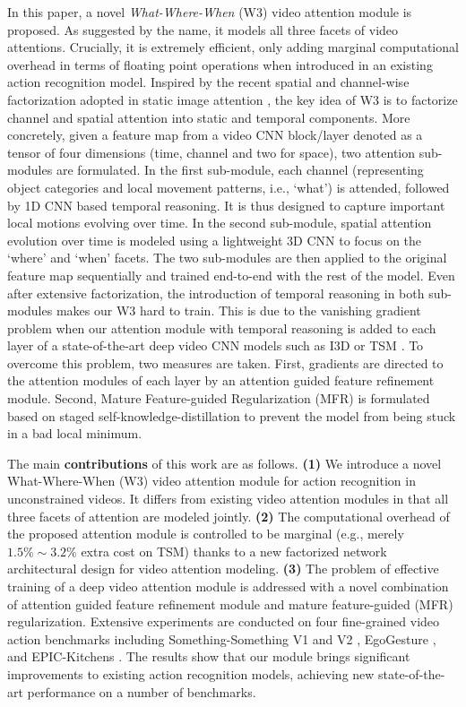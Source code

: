 \documentclass[runningheads]{llncs}
\makeatletter
\newcommand{\fullname}{What-Where-When}\newcommand{\shortname}{W3}\newcommand{\centered}[1]{\begin{tabular}{@{}l@{}} #1 \end{tabular}}
\makeatother
\begin{document}
In this paper, a novel {\em \fullname{}} (\shortname{}) video attention module is proposed. As suggested by the name, it models all three facets of video attentions. Crucially, it is extremely efficient, only adding marginal computational overhead in terms of floating point operations when 
introduced in an existing action recognition model. 
Inspired by the recent spatial and channel-wise factorization adopted in static image attention \cite{woo2018cbam}, 
the key idea of \shortname{} is to factorize channel and spatial attention into static and temporal components.
More concretely, given a feature map from a video CNN block/layer denoted as a tensor of four dimensions (time, channel and two for space), two attention sub-modules are formulated. 
In the first sub-module, each channel (representing object categories and  local movement patterns, i.e., `what') is attended, followed by 1D CNN based temporal reasoning. 
It is thus designed to capture important local motions evolving over time. In the second sub-module, spatial attention evolution over time is modeled using a lightweight 3D CNN to focus on the `where' and `when' facets. 
The two sub-modules are then applied to the original feature map sequentially and trained end-to-end with the rest of the model.  
Even after extensive factorization, the introduction of temporal reasoning in both sub-modules makes our \shortname{} hard to train. 
This is due to the vanishing gradient problem when our attention module with temporal reasoning is added to each layer of a state-of-the-art deep video CNN models such as I3D \cite{carreira2017quo} or TSM \cite{lin2019tsm}. 
To overcome this problem, two measures are taken. 
First,  gradients are  directed to the attention modules of each layer by an attention guided feature refinement module. 
Second, Mature Feature-guided Regularization (MFR) is formulated based on staged self-knowledge-distillation to prevent the model from being stuck in a bad local minimum.  




The main {\bf contributions} of this work are as follows. {\bf (1)}  We introduce a novel \fullname{} (\shortname{}) video attention module
for action recognition in unconstrained videos. It differs from existing video attention modules in that all three facets of attention are modeled jointly. {\bf (2)} The computational overhead of the proposed attention module is controlled to be marginal (e.g., merely $1.5\%\sim3.2\%$ extra cost on TSM) thanks to a new factorized network architectural design for video attention modeling. {\bf (3)} The problem of effective training of a deep video attention module is addressed with a novel combination of attention guided feature refinement module and mature feature-guided (MFR) regularization. 
Extensive experiments are conducted on four fine-grained video action benchmarks including Something-Something V1 \cite{goyal2017something} and V2 \cite{mahdisoltani2018fine},
EgoGesture \cite{zhang2018egogesture}, and EPIC-Kitchens \cite{damen2018scaling}. The results show that our module brings significant improvements to existing action recognition models, achieving new state-of-the-art performance on a number of benchmarks.
\end{document}
